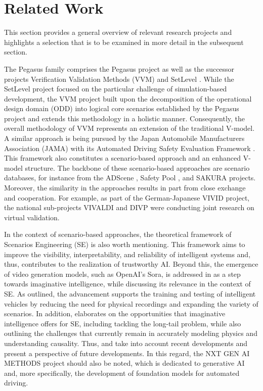 \section{Related Work}\label{02_StateOfTheArt}
This section provides a general overview of relevant research projects and highlights a selection that is to be examined in more detail in the subsequent section.  

The Pegasus family \cite{PEGASUS} comprises the Pegasus \cite{PEGASUS} project as well as the successor projects Verification Validation Methods (VVM) \cite{VVM} and SetLevel \cite{SETLevel}. While the SetLevel project focused on the particular challenge of simulation-based development, the VVM project built upon the decomposition of the operational design domain (ODD) into logical core scenarios established by the Pegasus project and extends this methodology in a holistic manner. Consequently, the overall methodology of VVM \cite{VVMOverall} represents an extension of the traditional V-model. A similar approach is being pursued by the Japan Automobile Manufacturers Association (JAMA) with its Automated Driving Safety Evaluation Framework \cite{JAMAFramework}. This framework also constitutes a scenario-based approach and an enhanced V-model structure. The backbone of these scenario-based approaches are scenario databases, for instance from the ADScene \cite{guyonvarch2023adscene}, Safety Pool \cite{SafetyPool}, and SAKURA \cite{SAKURA} projects. Moreover, the similarity in the approaches results in part from close exchange and cooperation. For example, as part of the German-Japanese VIVID \cite{VIVID} project, the national sub-projects VIVALDI and DIVP \cite{DIVP} were conducting joint research on virtual validation. 

In the context of scenario-based approaches, the theoretical framework of Scenarios Engineering (SE) \cite{li2022novel, li2022features} is also worth mentioning. This framework aims to improve the visibility, interpretability, and reliability of intelligent systems and, thus, contributes to the realization of trustworthy AI. Beyond this, the emergence of video generation models, such as \mbox{OpenAI's} Sora, is addressed in \cite{li2024sora} as a step towards imaginative intelligence, while discussing its relevance in the context of SE. As outlined, the advancement supports the training and testing of intelligent vehicles by reducing the need for physical recordings \cite{li2023novel} and expanding the variety of scenarios. In addition, \cite{wang2024does} elaborates on the opportunities that imaginative intelligence offers for SE, including tackling the long-tail problem, while also outlining the challenges that currently remain in accurately modeling physics and understanding causality. Thus, \cite{li2024sora} and \cite{wang2024does} take into account recent developments and present a perspective of future developments. In this regard, the NXT GEN AI METHODS \cite{NextAIM} project should also be noted, which is dedicated to generative AI and, more specifically, the development of foundation models for automated driving.

